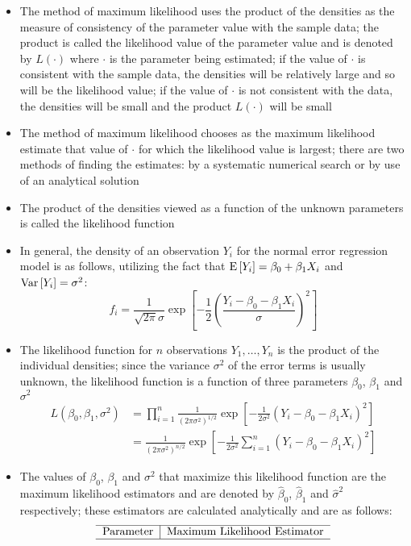 \begin{itemize}
\item The method of maximum likelihood uses the product of the densities as the measure of consistency of the parameter value with the sample data; the product is called the likelihood value of the parameter value and is denoted by $L(\cdot)$ where $\cdot$ is the parameter being estimated; if the value of $\cdot$ is consistent with the sample data, the densities will be relatively large and so will be the likelihood value; if the value of $\cdot$ is not consistent with the data, the densities will be small and the product $L(\cdot)$ will be small
\item The method of maximum likelihood chooses as the maximum likelihood estimate that value of $\cdot$ for which the likelihood value is largest; there are two methods of finding the estimates: by a systematic numerical search or by use of an analytical solution 
\item The product of the densities viewed as a function of the unknown parameters is called the likelihood function 
\item In general, the density of an observation $Y_i$ for the normal error regression model is as follows, utilizing the fact that $\expe{Y_i} = \beta_0 + \beta_1X_i$ and $\var{Y_i} = \sigma^2$: $$ f_i = \frac{1}{\sqrt{2\pi}\sigma} \exp\left[ -\frac{1}{2}\left(\frac{Y_i - \beta_0 - \beta_1X_i}{\sigma}\right)^2\right] $$ 
\item The likelihood function for $n$ observations $Y_1,\dots,Y_n$ is the product of the individual densities; since the variance $\sigma^2$ of the error terms is usually unknown, the likelihood function is a function of three parameters $\beta_0$, $\beta_1$ and $\sigma^2$ $$ \begin{aligned} L(\beta_0, \beta_1, \sigma^2) &= \prod_{i=1}^n \frac{1}{(2\pi \sigma^2)^{1/2}} \exp\left[-\frac{1}{2\sigma^2}(Y_i - \beta_0 - \beta_1X_i)^2\right] \\ &= \frac{1}{(2\pi\sigma^2)^{n/2}}\exp\left[-\frac{1}{2\sigma^2}\sum_{i=1}^n (Y_i - \beta_0 - \beta_1X_i)^2\right] \end{aligned} $$ 
\item The values of $\beta_0$, $\beta_1$ and $\sigma^2$ that maximize this likelihood function are the maximum likelihood estimators and are denoted by $\hat{\beta}_0$, $\hat{\beta}_1$ and $\hat{\sigma}^2$ respectively; these estimators are calculated analytically and are as follows: $$ \begin{tabular}{c|c} \hline 
Parameter & Maximum Likelihood Estimator \\ \hline 

\end{tabular}$$
\end{itemize}
